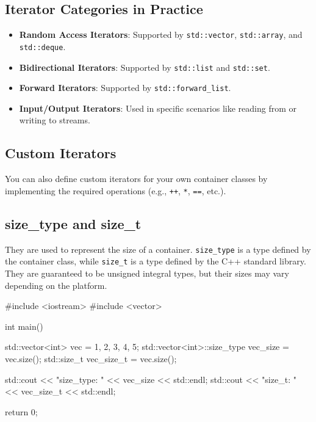 \subsection*{Iterator Categories in Practice}
\begin{itemize}
    \item \textbf{Random Access Iterators}: Supported by \texttt{std::vector}, \texttt{std::array}, and \texttt{std::deque}.
    \item \textbf{Bidirectional Iterators}: Supported by \texttt{std::list} and \texttt{std::set}.
    \item \textbf{Forward Iterators}: Supported by \texttt{std::forward\_list}.
    \item \textbf{Input/Output Iterators}: Used in specific scenarios like reading from or writing to streams.
\end{itemize}

\subsection*{Custom Iterators}
You can also define custom iterators for your own container classes by implementing the required operations (e.g., \texttt{++}, \texttt{*}, \texttt{==}, etc.).

\subsection{size\_type and size\_t}

They are used to represent the size of a container. \texttt{size\_type} is a type defined by the container class, while \texttt{size\_t} is a type defined by the C++ standard library.
They are guaranteed to be unsigned integral types, but their sizes may vary depending on the platform.

\begin{exampleblock}
\begin{codeblock}[language=C++]
#include <iostream>
#include <vector>

int main() {
    std::vector<int> vec = {1, 2, 3, 4, 5};
    std::vector<int>::size_type vec_size = vec.size();
    std::size_t vec_size_t = vec.size();

    std::cout << "size_type: " << vec_size << std::endl;
    std::cout << "size_t: " << vec_size_t << std::endl;

    return 0;
}
\end{codeblock}
\end{exampleblock}

